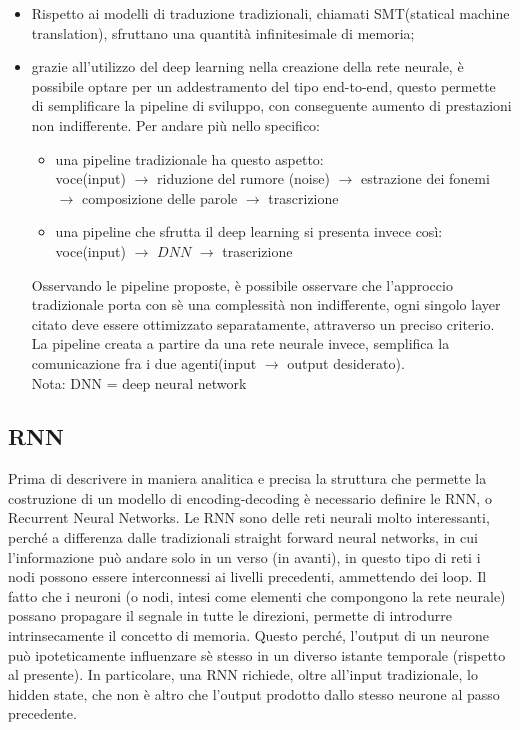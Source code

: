 \begin{itemize}
	\item Rispetto ai modelli di traduzione tradizionali, chiamati SMT(statical machine translation), sfruttano una quantità infinitesimale di memoria;
	\item grazie all'utilizzo del deep learning nella creazione della rete neurale, è possibile optare per un addestramento del tipo end-to-end, questo permette di semplificare la pipeline di sviluppo, con conseguente aumento di prestazioni non indifferente. Per andare più nello specifico:
	\begin{itemize}
		\item una pipeline tradizionale ha questo aspetto: 
		\\
		voce(input) $\rightarrow$ riduzione del rumore (noise)   $\rightarrow$ estrazione dei fonemi $\rightarrow$ composizione delle parole $\rightarrow$ trascrizione
		\item una pipeline che sfrutta il deep learning si presenta invece così:
		\\
		voce(input) $\rightarrow$ $DNN$  $\rightarrow$ trascrizione	 
	\end{itemize}
	Osservando le pipeline proposte, è possibile osservare che l'approccio tradizionale porta con sè una complessità non indifferente, ogni singolo layer citato deve essere ottimizzato separatamente, attraverso un preciso criterio. La pipeline creata a partire da una rete neurale invece, semplifica la comunicazione fra i due agenti(input $\rightarrow$ output desiderato).
	\\ 
	Nota: DNN = deep neural network
\end{itemize}

\subsection{RNN}

Prima di descrivere in maniera analitica e precisa la struttura che permette la costruzione di un modello di encoding-decoding è necessario definire le RNN, o Recurrent Neural Networks.
Le RNN sono delle reti neurali molto interessanti, perché a differenza dalle tradizionali straight forward neural networks, in cui l'informazione può andare solo in un verso (in avanti), in questo tipo di reti i nodi possono essere interconnessi ai livelli precedenti, ammettendo dei loop. Il fatto che i neuroni (o nodi, intesi come elementi che compongono la rete neurale) possano propagare il segnale in tutte le direzioni, permette di introdurre intrinsecamente il concetto di memoria. Questo perché, l'output di un neurone può ipoteticamente influenzare sè stesso in un diverso istante temporale (rispetto al presente). In particolare, una RNN richiede, oltre all'input tradizionale, lo hidden state, che non è altro che l'output prodotto dallo stesso neurone al passo precedente.

